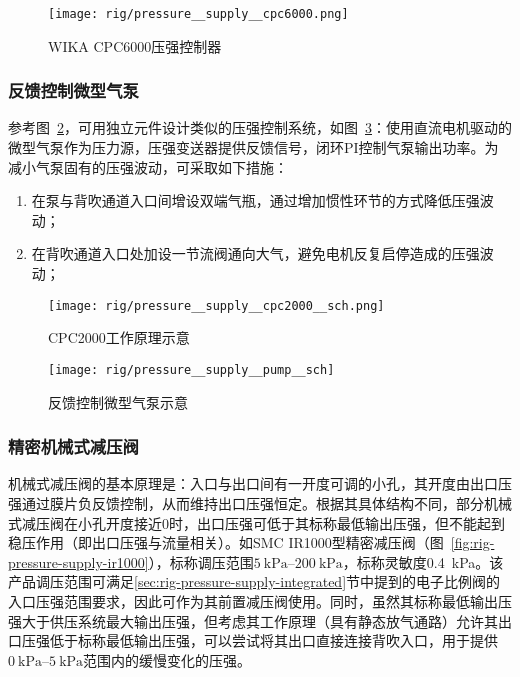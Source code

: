 \begin{figure}[tbh]
\centering
\texttt{[image: rig/pressure\_\_supply\_\_cpc6000.png]}
\caption{WIKA CPC6000压强控制器}
\label{fig:rig-pressure-supply-cpc6000}
\end{figure}

\subsubsection{反馈控制微型气泵}\label{sec:rig-pressure-supply-pump}

参考图~\ref{fig:rig-pressure-supply-cpc2000-sch}，可用独立元件设计类似的压强控制系统，如图~\ref{fig:rig-pressure-supply-pump-sch}：使用直流电机驱动的微型气泵作为压力源，压强变送器提供反馈信号，闭环PI控制气泵输出功率。为减小气泵固有的压强波动，可采取如下措施：

\begin{enumerate}
  \item 在泵与背吹通道入口间增设双端气瓶，通过增加惯性环节的方式降低压强波动；
  \item 在背吹通道入口处加设一节流阀通向大气，避免电机反复启停造成的压强波动；
\end{enumerate}

\begin{figure}[tbh]
\centering
\texttt{[image: rig/pressure\_\_supply\_\_cpc2000\_\_sch.png]}
\caption{CPC2000工作原理示意}
\label{fig:rig-pressure-supply-cpc2000-sch}
\end{figure}

\begin{figure}[tbhp]
\centering
\texttt{[image: rig/pressure\_\_supply\_\_pump\_\_sch]}
\caption{反馈控制微型气泵示意}
\label{fig:rig-pressure-supply-pump-sch}
\end{figure}

\subsubsection{精密机械式减压阀}\label{sec:rig-pressure-supply-reg}

机械式减压阀的基本原理是：入口与出口间有一开度可调的小孔，其开度由出口压强通过膜片负反馈控制，从而维持出口压强恒定。根据其具体结构不同，部分机械式减压阀在小孔开度接近0时，出口压强可低于其标称最低输出压强，但不能起到稳压作用（即出口压强与流量相关）。如SMC IR1000型精密减压阀（图~\ref{fig:rig-pressure-supply-ir1000}），标称调压范围$\SIrange{5}{200}{\kilo\pascal}$，标称灵敏度\SI{0.4}{\kilo\pascal}。该产品调压范围可满足\ref{sec:rig-pressure-supply-integrated}节中提到的电子比例阀的入口压强范围要求，因此可作为其前置减压阀使用。同时，虽然其标称最低输出压强大于供压系统最大输出压强，但考虑其工作原理（具有静态放气通路）允许其出口压强低于标称最低输出压强，可以尝试将其出口直接连接背吹入口，用于提供$\SIrange{0}{5}{\kilo\pascal}$范围内的缓慢变化的压强。

